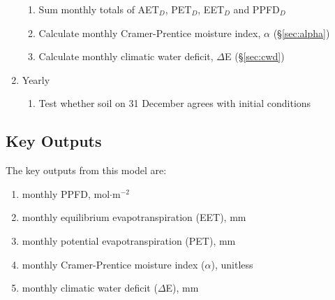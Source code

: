 \begin{enumerate}
\begin{enumerate}
		\item Sum monthly totals of AET$_D$, PET$_D$, EET$_D$ and PPFD$_D$
		\item Calculate monthly Cramer-Prentice moisture index, $\alpha$ 
		      (\S \ref{sec:alpha})
		\item Calculate monthly climatic water deficit, $\Delta$E 
		      (\S \ref{sec:cwd})
	\end{enumerate}
	\item Yearly
	\begin{enumerate}
		\item Test whether soil on 31 December agrees with initial conditions
	\end{enumerate}
\end{enumerate}

\subsection{Key Outputs}
\label{sec:outputs}
The key outputs from this model are:
\begin{enumerate}
	\item monthly PPFD, mol$\cdot$m$^{-2}$
	\item monthly equilibrium evapotranspiration (EET), mm
	\item monthly potential evapotranspiration (PET), mm
	\item monthly Cramer-Prentice moisture index ($\alpha$), unitless
	\item monthly climatic water deficit ($\Delta$E), mm
\end{enumerate}

